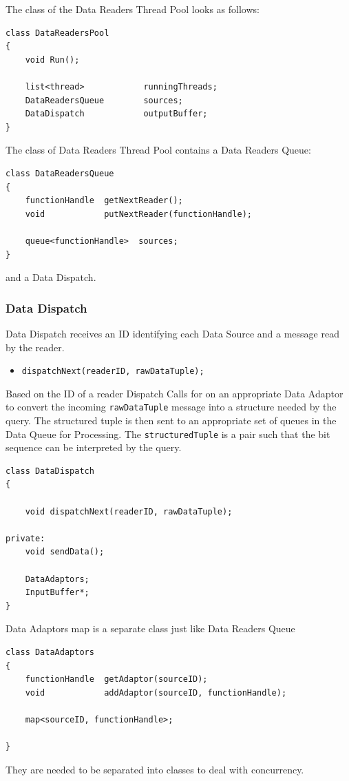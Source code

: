 \documentclass[14pt]{article}
\begin{document}
The class of the Data Readers Thread Pool looks as follows:
\begin{verbatim}
class DataReadersPool
{
	void Run();
	
    list<thread>            runningThreads;
    DataReadersQueue        sources;
    DataDispatch            outputBuffer;
}
\end{verbatim}

\noindent The class of Data Readers Thread Pool contains a Data Readers Queue:

\begin{verbatim}
class DataReadersQueue
{
	functionHandle  getNextReader();
	void            putNextReader(functionHandle);
	
    queue<functionHandle>  sources;
}
\end{verbatim}

\noindent and a Data Dispatch.

\subsubsection{Data Dispatch}

Data Dispatch receives an ID identifying each Data Source and a message read by the reader. 

\begin{itemize}
	\item {\tt dispatchNext(readerID, rawDataTuple);}
\end{itemize}

Based on the ID of a reader Dispatch Calls for on an appropriate Data Adaptor to convert the incoming {\tt rawDataTuple} message into a structure needed by the query. The structured tuple is then sent to an appropriate set of queues in the Data Queue for Processing. The {\tt structuredTuple} is a pair {\tt <size, bit-sequence>} such that the bit sequence can be interpreted by the query. 

\begin{verbatim}
class DataDispatch
{
	
	void dispatchNext(readerID, rawDataTuple);

private:
    void sendData();
	
    DataAdaptors;
    InputBuffer*;
}
\end{verbatim}

\noindent Data Adaptors map is a separate class just like Data Readers Queue

\begin{verbatim}
class DataAdaptors
{
    functionHandle  getAdaptor(sourceID);
    void            addAdaptor(sourceID, functionHandle);

    map<sourceID, functionHandle>;
	
}
\end{verbatim}
\noindent They are needed to be separated into classes to deal with concurrency.
\end{document}
